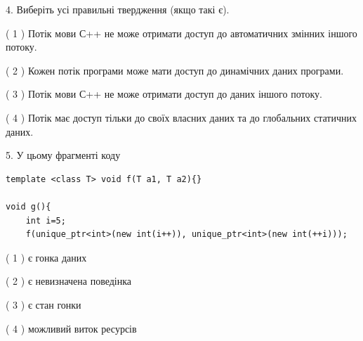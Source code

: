 \documentclass[12pt, ukrainian]{article}
\begin{document}
\begin {large}
{%
4. Виберіть усі правильні твердження (якщо такі є).\par
\vspace{2mm}

( 1 ) Потік мови С++ не може отримати доступ до автоматичних змінних іншого потоку.%

( 2 ) Кожен потік програми може мати доступ до динамічних даних програми.%

( 3 ) Потік мови С++ не може отримати доступ до даних іншого потоку.%

( 4 ) Потік має доступ тільки до своїх власних даних та до глобальних статичних даних.%


5. У цьому фрагменті коду
\begin{verbatim}
template <class T> void f(T a1, T a2){}

void g(){
    int i=5;
    f(unique_ptr<int>(new int(i++)), unique_ptr<int>(new int(++i)));
\end{verbatim}

( 1 ) є гонка даних%

( 2 ) є невизначена поведінка%

( 3 ) є стан гонки%

( 4 ) можливий виток ресурсів%
}
\end {large}
\end{document}
